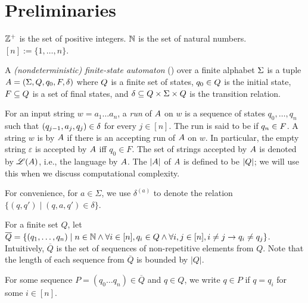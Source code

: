 \section{Preliminaries}

$\mathbb{Z}^+$ is the set of positive integers. $\mathbb{N}$ is the set of natural numbers. $[n]:=\{1, \ldots, n\}$. 

\begin{definition} \label{def:nfa}
	A \emph{(nondeterministic) finite-state automaton}
	(\FA{}) over a finite alphabet $\Sigma$ is a tuple ${A} =
	(\Sigma, Q, q_0, F, \delta)$ where 
	$Q$ is a finite set of 
	states, $q_0\in Q$ is
	the initial state, $F\subseteq Q$ is a set of final states, and 
	$\delta\subseteq Q \times 
	\Sigma \times  Q$ is the
	transition relation. 
\end{definition}

For an input string $w=a_1 \dots a_n$, a \emph{run} of ${A}$ on $w$
is a sequence of states $q_0, \ldots, q_n$ such that $(q_{j-1}, a_{j}, q_{j}) \in
\delta$  for every $j \in [n]$.
The run is said to be  if $q_n \in F$.
A string $w$ is  by ${A}$ if there is an accepting run of
${A}$ on $w$. In particular, the empty string $\varepsilon$ is accepted by ${A}$ iff $q_0 \in F$. The set of strings accepted by ${A}$ is denoted by $\mathscr{L}({A})$, i.e., the language  by ${A}$.
The  $|{A}|$ of ${A}$ is defined to be $|Q|$; we will
use this when we discuss computational complexity.

For convenience, for $a \in \Sigma$, we use $\delta^{(a)}$ to denote the  relation $\{(q, q') \mid (q, a, q') \in \delta\}$.

For a finite set $Q$, let $\overline{Q} = \{ (q_1, \ldots, q_n) \mid n \in \mathbb{N} \wedge \forall i \in [n], q_i \in Q \wedge \forall i,j \in[n], i
  \neq j \rightarrow q_i \neq q_j \}$. Intuitively, $\overline{Q}$ is the set of
sequences of non-repetitive elements from $Q$. Note that the length of each sequence from $\overline{Q}$ is bounded by 
  $| Q |$.


For some sequence $P = (q_0 \ldots q_n) \in \overline{Q}$ and  $q \in Q$, we write $q \in P$ if 
  $ q = q_i$ for some $i \in [n]$. 

